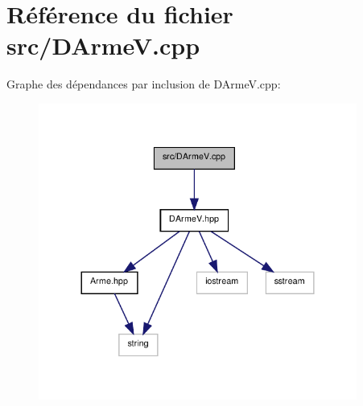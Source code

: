 \section{Référence du fichier src/\-D\-Arme\-V.cpp}
\label{_d_arme_v_8cpp}
Graphe des dépendances par inclusion de D\-Arme\-V.\-cpp\-:\nopagebreak
\begin{figure}[H]
\begin{center}
\leavevmode
\includegraphics[width=296pt]{_d_arme_v_8cpp__incl}
\end{center}
\end{figure}

